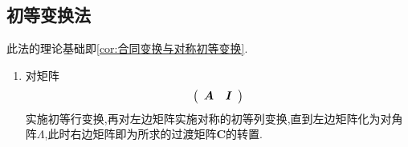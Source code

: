 \subsection{初等变换法}
此法的理论基础即\cref{cor:合同变换与对称初等变换}.
\begin{enumerate}[label=\arabic*)]
    \item 对矩阵\[\left(\begin{array}{c:c}
                      \bm{A} & \bm{I}
                  \end{array}\right)\]
          实施初等行变换,再对左边矩阵实施对称的初等列变换,直到左边矩阵化为对角阵$\bm{\varLambda}$,此时右边矩阵即为所求的过渡矩阵$\bm{C}$的转置.
\end{enumerate}
